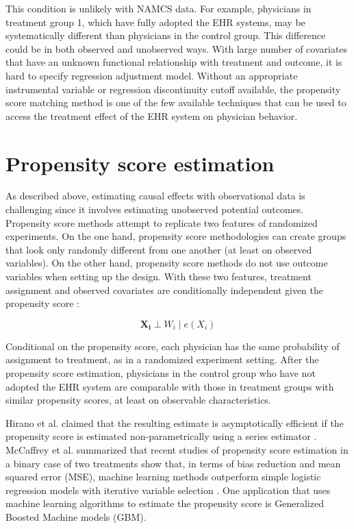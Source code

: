 \documentclass[12pt]{report}
\begin{document}
This condition is unlikely with NAMCS data. For example, physicians in treatment group 1, which have fully adopted the EHR systems, may be systematically different than physicians in the control group. This difference could be in both observed and unobserved ways. With large number of covariates that have an unknown functional relationship with treatment and outcome, it is hard to specify regression adjustment model. Without an appropriate instrumental variable or regression discontinuity cutoff available, the propensity score matching method is one of the few available techniques that can be used to access the treatment effect of the EHR system on physician behavior.

\section{Propensity score estimation}
As described above, estimating causal effects with observational data is challenging since it involves estimating unobserved potential outcomes. Propensity score methods attempt to replicate two features of randomized experiments. On the one hand, propensity score methodologies can create groups that look only randomly different from one another (at least on observed variables). On the other hand, propensity score methods do not use outcome variables when setting up the design. With these two features, treatment assignment and observed covariates are conditionally independent given the propensity score \citep{guo2014propensity}:

\begin{equation*}
\boldsymbol{X_i} \perp W_i \mid e(X_i)
\end{equation*}

Conditional on the propensity score, each physician has the same probability of assignment to treatment, as in a randomized experiment setting. After the propensity score estimation, physicians in the control group who have not adopted the EHR system are comparable with those in treatment groups with similar propensity scores, at least on observable characteristics. 

Hirano et al. claimed that the resulting estimate is asymptotically efficient if the propensity score is estimated non-parametrically using a series estimator \citep{hirano2003efficient}. McCaffrey et al. summarized that recent studies of propensity score estimation in a binary case of two treatments show that, in terms of bias reduction and mean squared error (MSE), machine learning methods outperform simple logistic regression models with iterative variable selection \citep{mccaffrey2013tutorial}. One application that uses machine learning algorithms to estimate the propensity score is Generalized Boosted Machine models (GBM).\label{place:gbm}
\end{document}
